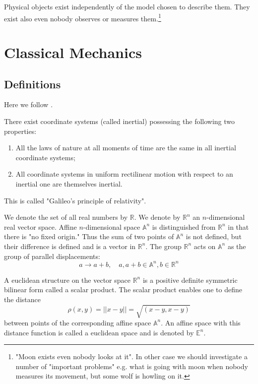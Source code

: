 \documentclass[11pt]{report}
\begin{document}
Physical objects exist independently of the model chosen to describe them. They exist
also even nobody observes or measures them.\footnote{"Moon exists even nobody looks at it".
In other case we should investigate a number of "important problems" e.g. what is going
with moon when nobody measures its movement, but some wolf is howling on it.}
\chapter{Classical Mechanics}
\label{class-mech}
\section{Definitions}
\label{class-mech-def}
Here we follow  \cite{arnold-cm-r}.%

There exist coordinate systems (called inertial) possessing the following two properties:
\begin{enumerate}
    \item All the laws of nature at all moments of time are the same in all inertial coordinate systems;
    \item  All coordinate systems in uniform rectilinear motion with respect to an inertial one are themselves inertial.
\end{enumerate}
This is called "Galileo's principle of relativity".

We denote the set of all real numbers by $\mathbb{R}$. We denote by $\mathbb{R}^n$ an $n$-dimensional 
real vector space. Affine $n$-dimensional space $\mathbb{A}^n$ is distinguished 
from $\mathbb{R}^n$ in that there is "no fixed origin." Thus the sum of two points
of $\mathbb{A}^n$ is not defined, but their difference is defined and is a vector in $\mathbb{R}^n$.
The group $\mathbb{R}^n$ acts on $\mathbb{A}^n$ as the group of parallel displacements: 
\[a \rightarrow a+b,\quad a,a+b \in \mathbb{A}^n,b\in\mathbb{R}^n\]

A euclidean structure on the vector space $\mathbb{R}^n$ is a positive definite symmetric
bilinear form called a scalar product. The scalar product enables one to
define the distance
\[ \rho(x,y)=||x-y||=\sqrt{(x - y,x- y)} \]
between points of the corresponding affine space $\mathbb{A}^n$. An affine space with this
distance function is called a euclidean space and is denoted by $\mathbb{E}^n$.
\end{document}

